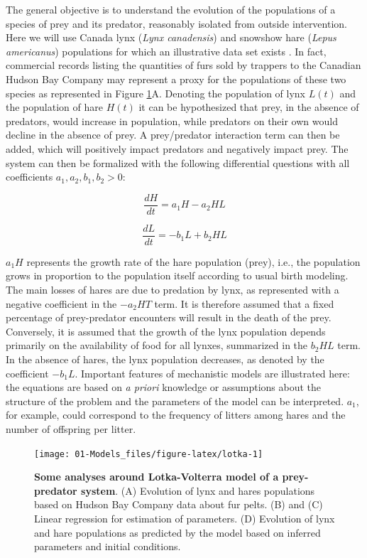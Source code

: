 \documentclass[a4paper,12pt,twoside,onecolumn,openright,final,oldfontcommands]{memoir}
\begin{document}
The general objective is to understand the evolution of the populations
of a species of prey and its predator, reasonably isolated from outside
intervention. Here we will use Canada lynx (\emph{Lynx canadensis}) and
snowshow hare (\emph{Lepus americanus}) populations for which an
illustrative data set exists \citep{hewitt1917conservation}. In fact,
commercial records listing the quantities of furs sold by trappers to
the Canadian Hudson Bay Company may represent a proxy for the
populations of these two species as represented in Figure
\ref{fig:lotka}A. Denoting the population of lynx \(L(t)\) and the
population of hare \(H(t)\) it can be hypothesized that prey, in the
absence of predators, would increase in population, while predators on
their own would decline in the absence of prey. A prey/predator
interaction term can then be added, which will positively impact
predators and negatively impact prey. The system can then be formalized
with the following differential questions with all coefficients
\(a_1, a_2, b_1, b_2 >0\):

\[\dfrac{dH}{dt}=a_1H-a_2HL\]

\[\dfrac{dL}{dt}=-b_1L+b_2HL\]

\(a_1H\) represents the growth rate of the hare population (prey), i.e.,
the population grows in proportion to the population itself according to
usual birth modeling. The main losses of hares are due to predation by
lynx, as represented with a negative coefficient in the \(-a_2HT\) term.
It is therefore assumed that a fixed percentage of prey-predator
encounters will result in the death of the prey. Conversely, it is
assumed that the growth of the lynx population depends primarily on the
availability of food for all lynxes, summarized in the \(b_2HL\) term.
In the absence of hares, the lynx population decreases, as denoted by
the coefficient \(-b_1L\). Important features of mechanistic models are
illustrated here: the equations are based on \emph{a priori} knowledge
or assumptions about the structure of the problem and the parameters of
the model can be interpreted. \(a_1\), for example, could correspond to
the frequency of litters among hares and the number of offspring per
litter.

\begin{figure}

{\centering \texttt{[image: 01-Models\_files/figure-latex/lotka-1]} 

}

\caption[Some analyses around Lotka-Volterra model of a prey-predator system]{\textbf{Some analyses around Lotka-Volterra model of
a prey-predator system}. (A) Evolution of lynx and hares populations
based on Hudson Bay Company data about fur pelts. (B) and (C) Linear
regression for estimation of parameters. (D) Evolution of lynx and hare
populations as predicted by the model based on inferred parameters and
initial conditions.}\label{fig:lotka}
\end{figure}
\end{document}
